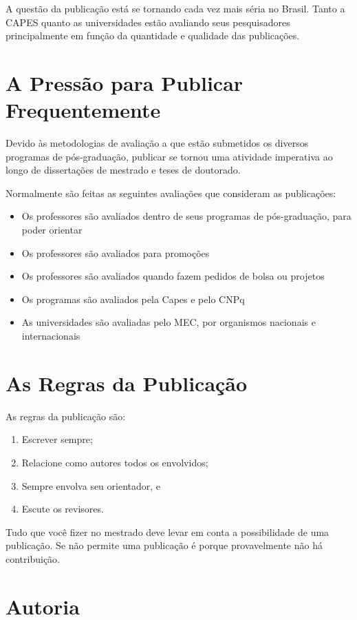 A questão da publicação está se tornando cada vez mais séria no Brasil. Tanto a CAPES quanto as universidades estão avaliando seus pesquisadores principalmente em função da quantidade e qualidade das publicações.

 \section{A Pressão para Publicar Frequentemente}

Devido às metodologias de avaliação a que estão submetidos os diversos programas de pós-graduação, publicar se tornou uma atividade imperativa ao longo de dissertações de mestrado e teses de doutorado.

Normalmente são feitas as seguintes avaliações que consideram as publicações:

\begin{itemize}
  \item Os professores são avaliados dentro de seus programas de pós-graduação, para poder orientar
  \item Os professores são avaliados para promoções
  \item Os professores são avaliados quando fazem pedidos de bolsa ou projetos
  \item Os programas são avaliados pela Capes e pelo CNPq
  \item As universidades são avaliadas pelo MEC, por organismos nacionais e internacionais 
\end{itemize}

 \section{As Regras da Publicação}

As regras da publicação são:
\begin{enumerate}
    \item Escrever sempre;
    \item Relacione como autores todos os envolvidos;
    \item Sempre envolva seu orientador, e
    \item Escute os revisores.
\end{enumerate}

Tudo que você fizer no mestrado deve levar em conta a possibilidade de uma publicação. Se não permite uma publicação é porque provavelmente não há contribuição.

 \section{Autoria}

